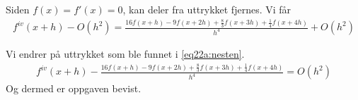 
Siden $f(x) = f'(x) = 0$, kan deler fra uttrykket fjernes. Vi får
\begin{multline}
f^{iv}(x+h)-O(h^2)=\frac{16f(x+h)-9f(x+2h)+\frac{8}{3}f(x+3h)+\frac{1}{4}f(x+4h)}{h^4}+O(h^2) \label{eq22a:nesten}
\end{multline}


Vi endrer på uttrykket som ble funnet i \ref{eq22a:nesten}. 
\begin{align}
{f^{iv}}(x + h) - \frac{16f(x+h)-9f(x+2h)+\frac{8}{3}f(x+3h)+\frac{1}{4}f(x+4h)}{h^4} = O(h^2) \label{eq22a:ferdig}
\end{align}
Og dermed er oppgaven bevist. 




